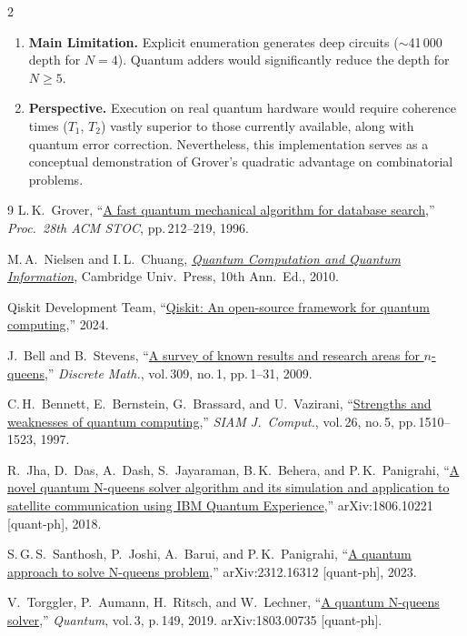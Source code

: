 \documentclass[9pt, a4paper]{extarticle}
\begin{document}
\begin{multicols}{2}
\begin{enumerate}
    \item \textbf{Main Limitation.}
          Explicit enumeration generates deep circuits ($\sim$41\,000 depth for $N\!=\!4$).
          Quantum adders would significantly reduce the depth for $N\!\geq\!5$.

    \item \textbf{Perspective.}
          Execution on real quantum hardware would require coherence times ($T_1$, $T_2$)
          vastly superior to those currently available, along with quantum error
          correction. Nevertheless, this implementation serves as a conceptual
          demonstration of Grover's quadratic advantage on combinatorial problems.
\end{enumerate}

\begin{thebibliography}{9}
\small
    L.\,K.~Grover,
    ``\href{https://doi.org/10.1145/237814.237866}{A fast quantum mechanical algorithm for database search},''
    \textit{Proc.\ 28th ACM STOC}, pp.\,212--219, 1996.

    M.\,A.~Nielsen and I.\,L.~Chuang,
    \href{https://doi.org/10.1017/CBO9780511976667}{\textit{Quantum Computation and Quantum Information}},
    Cambridge Univ.\ Press, 10th Ann.\ Ed., 2010.

    Qiskit Development Team,
    ``\href{https://qiskit.org}{Qiskit: An open-source framework for quantum computing},''
    2024.

    J.~Bell and B.~Stevens,
    ``\href{https://doi.org/10.1016/j.disc.2007.12.043}{A survey of known results and research areas for $n$-queens},''
    \textit{Discrete Math.}, vol.\,309, no.\,1, pp.\,1--31, 2009.

    C.\,H.~Bennett, E.~Bernstein, G.~Brassard, and U.~Vazirani,
    ``\href{https://doi.org/10.1137/S0097539796300933}{Strengths and weaknesses of quantum computing},''
    \textit{SIAM J.\ Comput.}, vol.\,26, no.\,5, pp.\,1510--1523, 1997.

    R.~Jha, D.~Das, A.~Dash, S.~Jayaraman, B.\,K.~Behera, and P.\,K.~Panigrahi,
    ``\href{https://arxiv.org/abs/1806.10221}{A novel quantum N-queens solver algorithm and its simulation
    and application to satellite communication using IBM Quantum Experience},''
    arXiv:1806.10221 [quant-ph], 2018.

    S.\,G.\,S.~Santhosh, P.~Joshi, A.~Barui, and P.\,K.~Panigrahi,
    ``\href{https://arxiv.org/abs/2312.16312}{A quantum approach to solve N-queens problem},''
    arXiv:2312.16312 [quant-ph], 2023.

    V.~Torggler, P.~Aumann, H.~Ritsch, and W.~Lechner,
    ``\href{https://doi.org/10.22331/q-2019-06-03-149}{A quantum N-queens solver},''
    \textit{Quantum}, vol.\,3, p.\,149, 2019.
    arXiv:1803.00735 [quant-ph].
\end{thebibliography}

\end{multicols}
\end{document}
